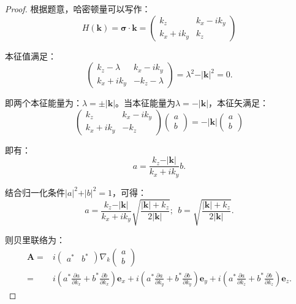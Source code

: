 \documentclass[reqno,a4paper,12pt]{amsart}
\begin{document}
\begin{enumerate}[1.]
\begin{proof}

根据题意，哈密顿量可以写作：
\[
	H(\mathbf{k}) = \mathbf{\sigma} \cdot \mathbf{k} = \left( \begin{matrix}
		k_z & k_x - ik_y \\
		k_x + ik_y & k_z
	\end{matrix} \right)
\]

本征值满足：
\[
	\left( \begin{matrix}
		k_z - \lambda & k_x-ik_y \\
		k_x+ik_y & -k_z - \lambda
	\end{matrix} \right) = \lambda^2 - \vert \mathbf{k} \vert^2 = 0.
\]

即两个本征能量为：$\lambda = \pm \vert \mathbf{k} \vert$。当本征能量为$\lambda = -\vert \mathbf{k} \vert$，本征矢满足：
\[
	\left( \begin{matrix}
		k_z & k_x-ik_y \\
		k_x+ik_y & -k_z
	\end{matrix} \right) 
	\left( \begin{matrix}
		a \\
		b
	\end{matrix} \right) = -\vert \mathbf{k} \vert 
	\left( \begin{matrix}
		a \\
		b
	\end{matrix} \right)
\]

即有：
\[
	a = \frac{k_z-\vert \mathbf{k} \vert}{k_x+ik_y} b.
\]

结合归一化条件$\vert a \vert^2 + \vert b \vert^2 = 1$，可得：
\[
	a = \frac{k_z-\vert \mathbf{k} \vert}{k_x+ik_y}\sqrt{\frac{\vert \mathbf{k} \vert + k_z}{2\vert \mathbf{k} \vert}}; \ \ b = \sqrt{\frac{\vert \mathbf{k} \vert + k_z}{2\vert \mathbf{k} \vert}}.
\]

则贝里联络为：
\begin{align*}
	\mathbf{A} =& i \left( \begin{matrix}
		a^* & b^*
	\end{matrix} \right) \nabla_k \left( \begin{matrix}
		a \\
		b
	\end{matrix} \right) \\
	=& i\left(a^* \frac{\partial a}{\partial k_x} + b^* \frac{\partial b}{\partial k_x} \right) \mathbf{e}_x + i\left(a^* \frac{\partial a}{\partial k_y} + b^* \frac{\partial b}{\partial k_y} \right) \mathbf{e}_y + i\left(a^* \frac{\partial a}{\partial k_z} + b^* \frac{\partial b}{\partial k_z} \right) \mathbf{e}_z.
\end{align*}


\end{proof}
\end{enumerate}
\end{document}
